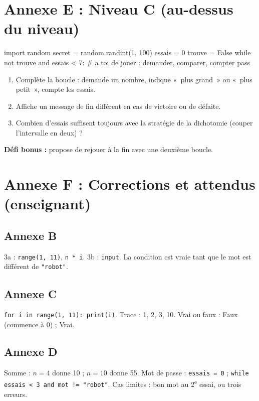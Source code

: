 \documentclass[11pt,a4paper]{article}
\begin{document}
\newpage
\section*{Annexe E : Niveau C (au-dessus du niveau)}

\begin{python}
import random
secret = random.randint(1, 100)
essais = 0
trouve = False
while not trouve and essais < 7:
    # a toi de jouer : demander, comparer, compter
    pass
\end{python}

\begin{enumerate}
 \item Complète la boucle : demande un nombre, indique «~plus grand~» ou «~plus petit~», compte les essais.
 \item Affiche un message de fin différent en cas de victoire ou de défaite.
 \item Combien d'essais suffisent toujours avec la stratégie de la dichotomie (couper l'intervalle en deux) ? \dotfill
\end{enumerate}

\textbf{Défi bonus :} propose de rejouer à la fin avec une deuxième boucle.

\newpage
\section*{Annexe F : Corrections et attendus (enseignant)}

\subsection*{Annexe B}
3a : \texttt{range(1, 11)}, \texttt{n * i}. 3b : \texttt{input}. La condition est vraie tant que le mot est différent de \texttt{"robot"}.

\subsection*{Annexe C}
\texttt{for i in range(1, 11): print(i)}. Trace : 1, 2, 3, 10. Vrai ou faux : Faux (commence à 0) ; Vrai.

\subsection*{Annexe D}
Somme : $n = 4$ donne 10 ; $n = 10$ donne 55. Mot de passe : \texttt{essais = 0} ; \texttt{while essais < 3 and mot != "robot"}. Cas limites : bon mot au 2\textsuperscript{e} essai, ou trois erreurs.
\end{document}
